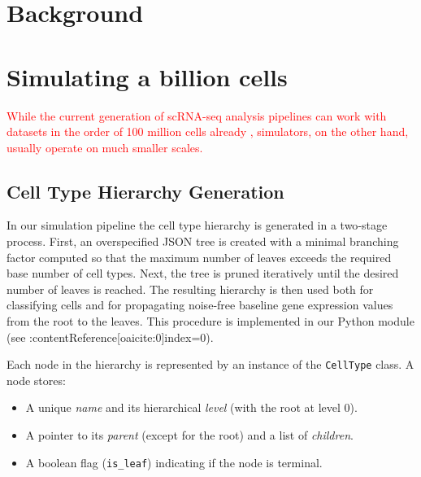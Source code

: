 \documentclass{article}
\newcommand{\phflo}[1]{\textcolor{red}{#1}}
\begin{document}
 
\section{Background}


\section{Simulating a billion cells}

\phflo{While the current generation of scRNA-seq analysis pipelines can work with datasets in the order of 100 million cells already \cite{wolf2018scanpy, zhang2025tahoe}, simulators, on the other hand, usually operate on much smaller scales. }

\subsection{Cell Type Hierarchy Generation}
\label{sec:cell_type_hierarchy}

In our simulation pipeline the cell type hierarchy is generated in a two‐stage process. First, an overspecified JSON tree is created with a minimal branching factor computed so that the maximum number of leaves exceeds the required base number of cell types. Next, the tree is pruned iteratively until the desired number of leaves is reached. The resulting hierarchy is then used both for classifying cells and for propagating noise‐free baseline gene expression values from the root to the leaves. This procedure is implemented in our Python module (see :contentReference[oaicite:0]{index=0}).

Each node in the hierarchy is represented by an instance of the \texttt{CellType} class. A node stores:
\begin{itemize}
	\item A unique \emph{name} and its hierarchical \emph{level} (with the root at level 0).
	\item A pointer to its \emph{parent} (except for the root) and a list of \emph{children}.
	\item A boolean flag (\texttt{is\_leaf}) indicating if the node is terminal.
\end{itemize}
\end{document}
